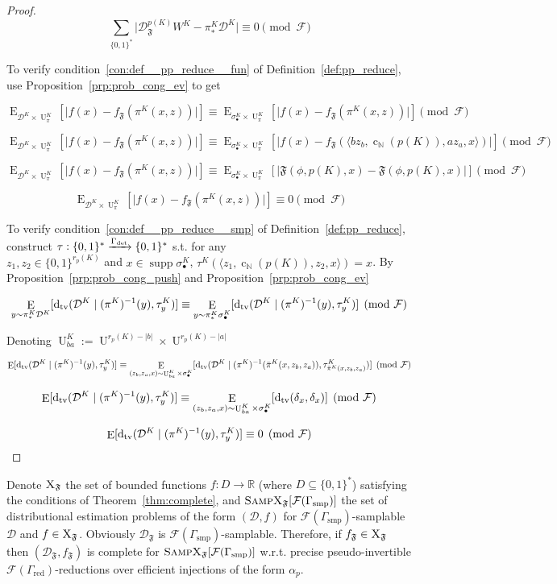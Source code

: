 \documentclass[11pt]{article}
\numberwithin{equation}{section}
\theoremstyle{definition}
\theoremstyle{plain}
\newcommand{\Bool}{\{0,1\}}
\newcommand{\Words}{{\Bool^*}}
\DeclareMathOperator{\Supp}{supp}
\DeclareMathOperator{\E}{E}
\DeclareMathOperator{\Un}{U}
\DeclareMathOperator{\En}{c}
\newcommand{\Dtv}{\operatorname{d}_{\textnormal{tv}}}
\newcommand{\Nats}{\mathbb{N}}
\newcommand{\Reals}{\mathbb{R}}
\newcommand{\Abs}[1]{\lvert #1 \rvert}
\newcommand{\Chev}[1]{\langle #1 \rangle}
\newcommand{\Dist}{\mathcal{D}}
\newcommand{\Fall}{\mathcal{F}}
\begin{document}
\begin{proof}
\[\sum_{\Words} \Abs{\Dist_{\mathfrak{F}}^{p(K)}W^K-\pi_*^K\Dist^K} \equiv 0 \pmod{\Fall}\]

To verify condition~\ref{con:def__pp_reduce__fun} of Definition~\ref{def:pp_reduce}, use Proposition~\ref{prp:prob_cong_ev} to get

\[\E_{\Dist^K \times \Un_\pi^K}[\Abs{f(x)-f_{\mathfrak{F}}(\pi^K(x,z))}] \equiv \E_{\sigma_\bullet^K \times \Un_\pi^K}[\Abs{f(x)-f_{\mathfrak{F}}(\pi^K(x,z))}] \pmod{\Fall}\]

\[\E_{\Dist^K \times \Un_\pi^K}[\Abs{f(x)-f_{\mathfrak{F}}(\pi^K(x,z))}] \equiv \E_{\sigma_\bullet^K \times \Un_\pi^K}[\Abs{f(x)-f_{\mathfrak{F}}(\Chev{bz_b,\En_\Nats(p(K)),az_a,x})}] \pmod{\Fall}\]

\[\E_{\Dist^K \times \Un_\pi^K}[\Abs{f(x)-f_{\mathfrak{F}}(\pi^K(x,z))}] \equiv \E_{\sigma_\bullet^K \times \Un_\pi^K}[\Abs{\mathfrak{F}(\phi,p(K),x)-\mathfrak{F}(\phi,p(K),x)}] \pmod{\Fall}\]

\[\E_{\Dist^K \times \Un_\pi^K}[\Abs{f(x)-f_{\mathfrak{F}}(\pi^K(x,z))}] \equiv 0 \pmod{\Fall}\]

To verify condition~\ref{con:def__pp_reduce__smp} of Definition~\ref{def:pp_reduce}, construct ${\tau: \Words \xrightarrow{\Gamma_{\textnormal{det}}} \Words}$ s.t. for any\\ $z_1,z_2 \in \Bool^{r_p(K)}$ and ${x \in \Supp \sigma_\bullet^K}$, ${\tau^K(\Chev{z_1,\En_\Nats(p(K)),z_2,x})=x}$. By Proposition~\ref{prp:prob_cong_push} and Proposition~\ref{prp:prob_cong_ev}

\[\E_{y \sim \pi_*^K\Dist^K}[\Dtv(\Dist^K \mid (\pi^K)^{-1}(y),\tau_y^K)] \equiv \E_{y \sim \pi_*^K\sigma_\bullet^K}[\Dtv(\Dist^K \mid (\pi^K)^{-1}(y),\tau_y^K)] \pmod{\Fall}\]

Denoting ${\Un_{ba}^K:=\Un^{r_p(K)-\Abs{b}} \times \Un^{r_p(K)-\Abs{a}}}$

\[\E[\Dtv(\Dist^K \mid (\pi^K)^{-1}(y),\tau_y^K)] \equiv \E_{(z_b,z_a,x) \sim \Un_{ba}^K \times \sigma_\bullet^K}[\Dtv(\Dist^K \mid (\pi^K)^{-1}(\bar{\pi}^K(x,z_b,z_a)),\tau_{\bar{\pi}^K(x,z_b,z_a)}^K)] \pmod{\Fall}\]

\[\E[\Dtv(\Dist^K \mid (\pi^K)^{-1}(y),\tau_y^K)] \equiv \E_{(z_b,z_a,x) \sim \Un_{ba}^K \times \sigma_\bullet^K}[\Dtv(\delta_x,\delta_x)] \pmod{\Fall}\]

\[\E[\Dtv(\Dist^K \mid (\pi^K)^{-1}(y),\tau_y^K)] \equiv 0 \pmod{\Fall}\]
%
\end{proof}

Denote ${\textsc{X}_\mathfrak{F}}$ the set of bounded functions ${f: D \rightarrow \Reals}$ (where ${D \subseteq \Words}$) satisfying the conditions of Theorem~\ref{thm:complete}, and ${\textsc{SampX}_\mathfrak{F}[\Fall(\Gamma_{\text{smp}})]}$ the set of distributional estimation problems of the form ${(\Dist,f)}$ for ${\Fall(\Gamma_{\text{smp}})}$-samplable ${\Dist}$ and ${f \in \textsc{X}_\mathfrak{F}}$. Obviously ${\Dist_{\mathfrak{F}}}$ is ${\Fall(\Gamma_{\text{smp}})}$-samplable. Therefore, if ${f_{\mathfrak{F}} \in \textsc{X}_\mathfrak{F}}$ then ${(\Dist_{\mathfrak{F}},f_{\mathfrak{F}})}$ is complete for ${\textsc{SampX}_\mathfrak{F}[\Fall(\Gamma_{\text{smp}})]}$ w.r.t. precise pseudo-invertible ${\Fall(\Gamma_{\text{red}})}$-reductions over efficient injections of the form ${\alpha_p}$.
\end{document}
